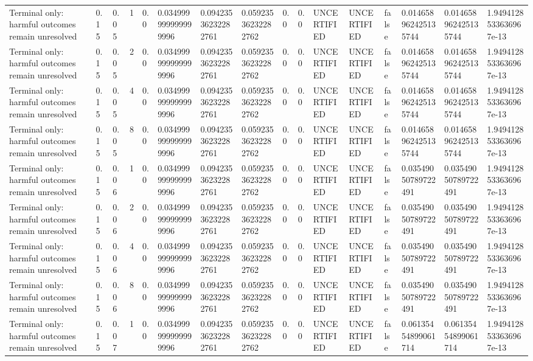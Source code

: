 \begin{tabular}{llllllllllllllll}
Terminal only: harmful outcomes remain unresolved & 0.15 & 0.05 & 1 & 0.0 & 0.034999999999999996 & 0.09423536232282761 & 0.05923536232282762 & 0.0 & 0.0 & UNCERTIFIED & UNCERTIFIED & false & 0.014658962425135744 & 0.014658962425135744 & 1.9494128533636967e-13 \\
Terminal only: harmful outcomes remain unresolved & 0.15 & 0.05 & 2 & 0.0 & 0.034999999999999996 & 0.09423536232282761 & 0.05923536232282762 & 0.0 & 0.0 & UNCERTIFIED & UNCERTIFIED & false & 0.014658962425135744 & 0.014658962425135744 & 1.9494128533636967e-13 \\
Terminal only: harmful outcomes remain unresolved & 0.15 & 0.05 & 4 & 0.0 & 0.034999999999999996 & 0.09423536232282761 & 0.05923536232282762 & 0.0 & 0.0 & UNCERTIFIED & UNCERTIFIED & false & 0.014658962425135744 & 0.014658962425135744 & 1.9494128533636967e-13 \\
Terminal only: harmful outcomes remain unresolved & 0.15 & 0.05 & 8 & 0.0 & 0.034999999999999996 & 0.09423536232282761 & 0.05923536232282762 & 0.0 & 0.0 & UNCERTIFIED & UNCERTIFIED & false & 0.014658962425135744 & 0.014658962425135744 & 1.9494128533636967e-13 \\
Terminal only: harmful outcomes remain unresolved & 0.15 & 0.06 & 1 & 0.0 & 0.034999999999999996 & 0.09423536232282761 & 0.05923536232282762 & 0.0 & 0.0 & UNCERTIFIED & UNCERTIFIED & false & 0.03549050789722491 & 0.03549050789722491 & 1.9494128533636967e-13 \\
Terminal only: harmful outcomes remain unresolved & 0.15 & 0.06 & 2 & 0.0 & 0.034999999999999996 & 0.09423536232282761 & 0.05923536232282762 & 0.0 & 0.0 & UNCERTIFIED & UNCERTIFIED & false & 0.03549050789722491 & 0.03549050789722491 & 1.9494128533636967e-13 \\
Terminal only: harmful outcomes remain unresolved & 0.15 & 0.06 & 4 & 0.0 & 0.034999999999999996 & 0.09423536232282761 & 0.05923536232282762 & 0.0 & 0.0 & UNCERTIFIED & UNCERTIFIED & false & 0.03549050789722491 & 0.03549050789722491 & 1.9494128533636967e-13 \\
Terminal only: harmful outcomes remain unresolved & 0.15 & 0.06 & 8 & 0.0 & 0.034999999999999996 & 0.09423536232282761 & 0.05923536232282762 & 0.0 & 0.0 & UNCERTIFIED & UNCERTIFIED & false & 0.03549050789722491 & 0.03549050789722491 & 1.9494128533636967e-13 \\
Terminal only: harmful outcomes remain unresolved & 0.15 & 0.07 & 1 & 0.0 & 0.034999999999999996 & 0.09423536232282761 & 0.05923536232282762 & 0.0 & 0.0 & UNCERTIFIED & UNCERTIFIED & false & 0.06135454899061714 & 0.06135454899061714 & 1.9494128533636967e-13 \\

\end{tabular}
